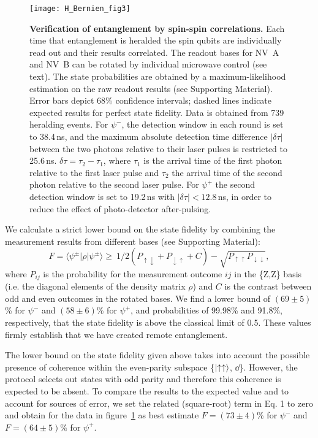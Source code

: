 \begin{figure}[tp]
	\texttt{[image: H\_Bernien\_fig3]}
	\caption{\label{fig:LDE-fig3} \textbf{Verification of entanglement by spin-spin correlations.} Each time that entanglement is heralded the spin qubits are individually read out and their results correlated. The readout bases for NV~A and NV~B can be rotated by individual microwave control (see text). The state probabilities are obtained by a maximum-likelihood estimation on the raw readout results (see Supporting Material). Error bars depict 68\% confidence intervals; dashed lines indicate expected results for perfect state fidelity. Data is obtained from 739 heralding events. For $\psi^-$, the detection window in each round is set to 38.4$\,$ns, and the maximum absolute detection time difference $|\delta\tau|$ between the two photons relative to their laser pulses is restricted to 25.6$\,$ns. $\delta\tau=\tau_2-\tau_1$, where $\tau_1$ is the arrival time of the first photon relative to the first laser pulse and $\tau_2$ the arrival time of the second photon relative to the second laser pulse. For $\psi^+$ the second detection window is set to 19.2$\,$ns with $|\delta\tau|<12.8\,$ns, in order to reduce the effect of photo-detector after-pulsing.}
\end{figure}

We calculate a strict lower bound on the state fidelity by combining the measurement results from different bases (see Supporting Material):
\begin{equation}\label{eq:LDE_LB}
F = \langle\psi^\pm|\rho|\psi^\pm \rangle \geq \ 1/2(P_{\uparrow\downarrow}+P_{\downarrow\uparrow}+C)-\sqrt{P_{\uparrow\uparrow}P_{\downarrow\downarrow}},
\end{equation}
where $P_{ij}$ is the probability for the measurement outcome $ij$ in the \{Z,Z\} basis (i.e. the diagonal elements of the density matrix $\rho$) and $C$ is the contrast between odd and even outcomes in the rotated bases. We find a lower bound of $(69\pm5)$\% for $\psi^-$ and $(58\pm6)$\% for $\psi^+$, and probabilities of 99.98\% and 91.8\%, respectively, that the state fidelity is above the classical limit of 0.5. These values firmly establish that we have created remote entanglement.

The lower bound on the state fidelity given above takes into account the possible presence of coherence within the even-parity subspace \{$\left|\uparrow\uparrow\right\rangle$, $\dd$\}. However, the protocol selects out states with odd parity and therefore this coherence is expected to be absent. To compare the results to the expected value and to account for sources of error, we set the related (square-root) term in Eq. 1 to zero and obtain for the data in figure~\ref{fig:LDE-fig3} as best estimate $F=(73\pm4)$\% for $\psi^-$ and $F=(64\pm5)\%$ for $\psi^+$.

